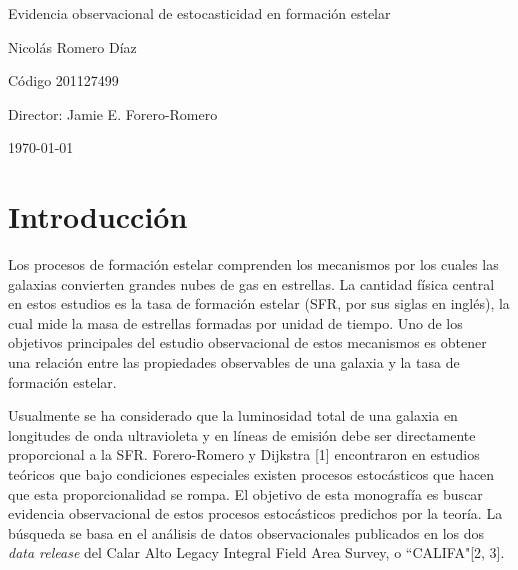 \documentclass[12pt]{article}
\begin{document}
\begin{center}
\Huge
Evidencia observacional de estocasticidad en formaci\'on estelar

\vspace{3mm}
\Large Nicol\'as Romero D\'iaz

\large
C\'odigo 201127499


\vspace{2mm}
\Large
Director: Jamie E. Forero-Romero

\normalsize
\vspace{2mm}

\today
\end{center}


\normalsize
\section{Introducci\'on}


Los procesos de formaci\'on estelar comprenden los mecanismos por los
cuales las galaxias convierten grandes nubes de gas en estrellas.
La cantidad f\'isica central en estos estudios es la tasa de
formaci\'on estelar (SFR, por sus siglas en ingl\'es), la cual mide
la masa de estrellas formadas por unidad de tiempo.
Uno de los objetivos principales del estudio observacional de estos
mecanismos es obtener una relaci\'on entre las propiedades observables
de una galaxia y la tasa de formaci\'on estelar.




Usualmente se ha considerado que la luminosidad total de una galaxia
en longitudes de onda ultravioleta y en l\'ineas de emisi\'on debe ser
directamente proporcional a la SFR.
Forero-Romero y Dijkstra [1] encontraron en estudios te\'oricos que
bajo condiciones especiales existen procesos estoc\'asticos que hacen
que esta proporcionalidad se rompa.
El objetivo de esta monograf\'ia es buscar evidencia observacional de
estos procesos estoc\'asticos predichos por la teor\'ia.
La b\'usqueda se
basa en el an\'alisis de datos observacionales publicados en los dos
\textit{data release} del Calar Alto Legacy Integral Field Area
Survey, o ``CALIFA"[2, 3].
\end{document}
